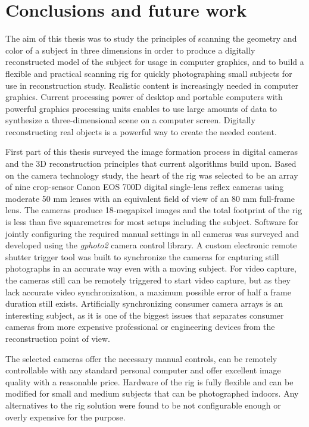 \section{Conclusions and future work} \label{sec:conclusion}
The aim of this thesis was to study the principles of scanning the geometry and color of a subject in three dimensions in order to produce a digitally reconstructed model of the subject for usage in computer graphics, and to build a flexible and practical scanning rig for quickly photographing small subjects for use in reconstruction study.
Realistic content is increasingly needed in computer graphics.
Current processing power of desktop and portable computers with powerful graphics processing units enables to use large amounts of data to synthesize a three-dimensional scene on a computer screen.
Digitally reconstructing real objects is a powerful way to create the needed content.

First part of this thesis surveyed the image formation process in digital cameras and the 3D reconstruction principles that current algorithms build upon.
Based on the camera technology study, the heart of the rig was selected to be an array of nine crop-sensor Canon EOS 700D digital single-lens reflex cameras using moderate 50 mm lenses with an equivalent field of view of an 80 mm full-frame lens.
The cameras produce 18-megapixel images and the total footprint of the rig is less than five squaremetres for most setups including the subject.
Software for jointly configuring the required manual settings in all cameras was surveyed and developed using the \emph{gphoto2} camera control library.
A custom electronic remote shutter trigger tool was built to synchronize the cameras for capturing still photographs in an accurate way even with a moving subject.
For video capture, the cameras still can be remotely triggered to start video capture, but as they lack accurate video synchronization, a maximum possible error of half a frame duration still exists.
Artificially synchronizing consumer camera arrays is an interesting subject, as it is one of the biggest issues that separates consumer cameras from more expensive professional or engineering devices from the reconstruction point of view.

The selected cameras offer the necessary manual controls, can be remotely controllable with any standard personal computer and offer excellent image quality with a reasonable price.
Hardware of the rig is fully flexible and can be modified for small and medium subjects that can be photographed indoors.
Any alternatives to the rig solution were found to be not configurable enough or overly expensive for the purpose.

